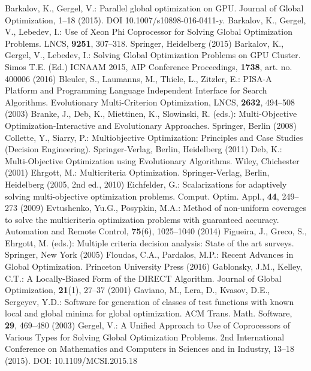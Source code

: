 \documentclass[smallcondensed]{svjour3}     %
\begin{document}
\begin{thebibliography}{}

	Barkalov, K., Gergel, V.: Parallel global optimization on GPU. Journal of Global Optimization, 1--18 (2015). DOI 10.1007/s10898-016-0411-y.
	Barkalov, K., Gergel, V., Lebedev, I.: Use of Xeon Phi Coprocessor for Solving Global Optimization Problems. LNCS, \textbf{9251}, 307--318. Springer, Heidelberg (2015)
	Barkalov, K., Gergel, V., Lebedev, I.: Solving Global Optimization Problems on GPU Cluster. Simos T.E. (Ed.) ICNAAM 2015, AIP Conference Proceedings, \textbf{1738}, art. no. 400006 (2016)
	Bleuler, S., Laumanns, M., Thiele, L., Zitzler, E.: PISA-A Platform and Programming Language Independent Interface for Search Algorithms. Evolutionary Multi-Criterion Optimization, LNCS, \textbf{2632}, 494--508 (2003)
	Branke, J., Deb, K., Miettinen, K., Slowinski, R. (eds.): Multi-Objective Optimization-Interactive and Evolutionary Approaches. Springer, Berlin (2008)
	Collette, Y., Siarry, P.: Multiobjective Optimization: Principles and Case Studies (Decision Engineering). Springer-Verlag, Berlin, Heidelberg (2011)
	Deb, K.: Multi-Objective Optimization using Evolutionary Algorithms. Wiley, Chichester (2001)
	Ehrgott, M.: Multicriteria Optimization. Springer-Verlag, Berlin, Heidelberg (2005, 2nd ed., 2010)
	Eichfelder, G.: Scalarizations for adaptively solving multi-objective optimization problems. Comput. Optim. Appl., \textbf{44}, 249--273 (2009)
	Evtushenko, Yu.G., Posypkin, M.A.: Method of non-uniform coverages to solve the multicriteria optimization problems with guaranteed accuracy. Automation and Remote Control, \textbf{75}(6), 1025--1040 (2014)
	Figueira, J., Greco, S., Ehrgott, M. (eds.): Multiple criteria decision analysis: State of the art surveys.  Springer, New York (2005)
	Floudas, C.A., Pardalos, M.P.: Recent Advances in Global Optimization. Princeton University Press (2016)
	Gablonsky, J.M., Kelley, C.T.: A Locally-Biased Form of the DIRECT Algorithm. Journal of Global Optimization, \textbf{21}(1), 27--37 (2001)
	Gaviano, M., Lera, D., Kvasov, D.E., Sergeyev, Y.D.: Software for generation of classes of test functions with known local and global minima for global optimization. ACM Trans. Math. Software, \textbf{29}, 469--480 (2003)
	Gergel, V.: A Unified Approach to Use of Coprocessors of Various Types for Solving Global Optimization Problems. 2nd International Conference on Mathematics and Computers in Sciences and in Industry, 13--18 (2015). DOI: 10.1109/MCSI.2015.18 

\end{thebibliography}
\end{document}
